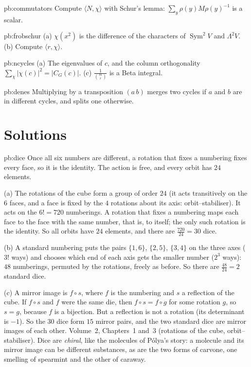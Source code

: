 \begin{hint}{pb:commutators}
Compute $\langle N,\chi\rangle$ with Schur's lemma: $\sum_y\rho(y)M\rho(y)^{-1}$ is a scalar.
\end{hint}

\begin{hint}{pb:frobschur}
(a) $\chi(x^2)$ is the difference of the characters of $\operatorname{Sym}^2V$ and $\Lambda^2V$. (b) Compute $\langle r,\chi\rangle$.
\end{hint}

\begin{hint}{pb:ncycles}
(a) The eigenvalues of $c$, and the column orthogonality $\sum_\chi|\chi(c)|^2=|C_G(c)|$. (c) $\frac1{\binom mr}$ is a Beta
integral.
\end{hint}

\begin{hint}{pb:denes}
Multiplying by a transposition $(a\,b)$ merges two cycles if $a$ and $b$ are in different cycles, and splits one otherwise.
\end{hint}

\section{Solutions}

\begin{solution}{pb:dice}
\idea Once all six numbers are different, a rotation that fixes a numbering fixes every face, so it is the identity. The
action is free, and every orbit has $24$ elements.

\writeup (a) The rotations of the cube form a group of order $24$ (it acts transitively on the $6$ faces, and a face is fixed
by the $4$ rotations about its axis: orbit--stabiliser). It acts on the $6!=720$ numberings. A rotation that fixes a numbering
maps each face to the face with the same number, that is, to itself; the only such rotation is the identity. So all orbits
have $24$ elements, and there are $\frac{720}{24}=30$ dice.

(b) A standard numbering puts the pairs $\{1,6\}$, $\{2,5\}$, $\{3,4\}$ on the three axes ($3!$ ways) and chooses which end of
each axis gets the smaller number ($2^3$ ways): $48$ numberings, permuted by the rotations, freely as before. So there are
$\frac{48}{24}=2$ standard dice.

(c) A mirror image is $f\circ s$, where $f$ is the numbering and $s$ a reflection of the cube. If $f\circ s$ and $f$ were the
same die, then $f\circ s=f\circ g$ for some rotation $g$, so $s=g$, because $f$ is a bijection. But a reflection is not a
rotation (its determinant is $-1$). So the $30$ dice form $15$ mirror pairs, and the two standard dice are mirror images of each other.
\tools Volume~2, Chapters~1 and~3 (rotations of the cube, orbit--stabiliser).
\leads Dice are \emph{chiral}, like the molecules of Pólya's story: a molecule and its mirror image can be different
substances, as are the two forms of carvone, one smelling of spearmint and the other of caraway.
\end{solution}

